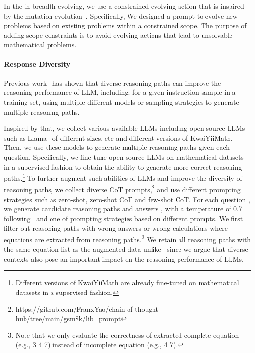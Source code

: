 \documentclass{article}
\begin{document}
In the in-breadth evolving, we use a constrained-evolving action that is inspired by the mutation evolution~\cite{xu2023wizardlm}. 
Specifically, We designed a prompt to evolve new problems based on existing problems within a constrained scope.
The purpose of adding scope constraints is to avoid evolving actions that lead to unsolvable mathematical problems.





\paragraph{Response Diversity}
Previous work~\cite{ho2022large,yuan2023scaling} has shown that diverse reasoning paths can improve the reasoning performance of LLM, including: for a given instruction sample in a training set, using multiple different models or sampling strategies to generate multiple reasoning paths.


Inspired by that, we collect various available LLMs including open-source LLMs such as Llama~\cite{touvron2023llama,touvron2023llama2} of different sizes, etc and different versions of KwaiYiiMath. Then, we use these models to generate multiple reasoning paths given each question. 
Specifically, we fine-tune open-source LLMs on mathematical datasets in a supervised fashion to 
obtain the ability to generate more correct reasoning paths.\footnote{Different versions of KwaiYiiMath are already fine-tuned on mathematical datasets in a supervised fashion.} To further augment such abilities of LLMs and improve the diversity of reasoning paths, we collect diverse CoT prompts,\footnote{https://github.com/FranxYao/chain-of-thought-hub/tree/main/gsm8k/lib\_prompt} and use different prompting strategies such as zero-shot, zero-shot CoT and few-shot CoT. For each question , we generate  candidate reasoning paths and answers ,  with a temperature of 0.7 following~\citet{cobbe2021training} and one of prompting strategies based on different prompts. We first filter out reasoning paths with wrong answers  or wrong calculations where equations are extracted from reasoning paths.\footnote{Note that we only evaluate the correctness of extracted complete equation (e.g., 3  4  7) instead of incomplete equation (e.g.,  4  7).} We retain all reasoning paths with the same equation list as the augmented data unlike~\cite {yuan2023scaling} since we argue that diverse contexts also pose an important impact on the reasoning performance of LLMs.
\end{document}
